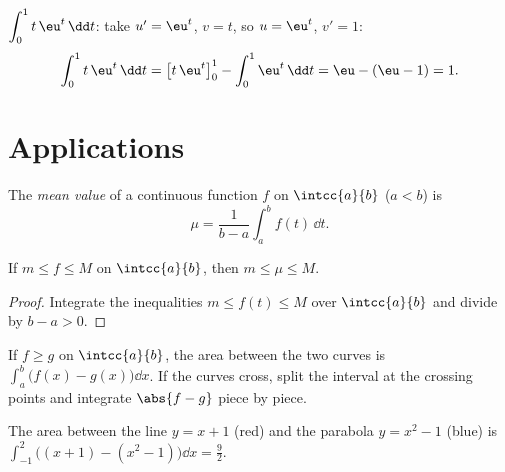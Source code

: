 \begin{example}\label{ex:tle:integ:ibp}
$\displaystyle\int_0^1 t\,\eu^{t}\,\dd t$: take $u' = \eu^t$, $v = t$, so
$u = \eu^t$, $v' = 1$:
\[
\int_0^1 t\,\eu^t\,\dd t = \bigl[t\,\eu^t\bigr]_0^1 - \int_0^1 \eu^t\,\dd t
= \eu - (\eu - 1) = 1 .
\]
\end{example}

\section{Applications}

\begin{definition}\label{def:tle:integ:mean}
The \emph{mean value} of a continuous function $f$ on
$\intcc{a}{b}$ ($a<b$) is
\[
\mu = \frac{1}{b-a}\int_a^b f(t)\,\dd t .
\]
\end{definition}

\begin{proposition}\label{prop:tle:integ:meanbounds}
If $m \leq f \leq M$ on $\intcc{a}{b}$, then $m \leq \mu \leq M$.
\end{proposition}

\begin{proof}
Integrate the inequalities $m \leq f(t) \leq M$ over $\intcc{a}{b}$ and
divide by $b - a > 0$.
\end{proof}

\begin{method}\label{met:tle:integ:areabetween}
If $f \geq g$ on $\intcc{a}{b}$, the area between the two curves is
$\int_a^b \bigl(f(x) - g(x)\bigr)\dd x$. If the curves cross, split the
interval at the crossing points and integrate $\abs{f - g}$ piece by piece.
\end{method}

\begin{omfigure}

{\small The area between the line $y = x + 1$ (red) and the parabola
$y = x^2 - 1$ (blue) is $\int_{-1}^{2}
\bigl((x+1) - (x^2-1)\bigr)\dd x = \frac92$.}
\end{omfigure}

